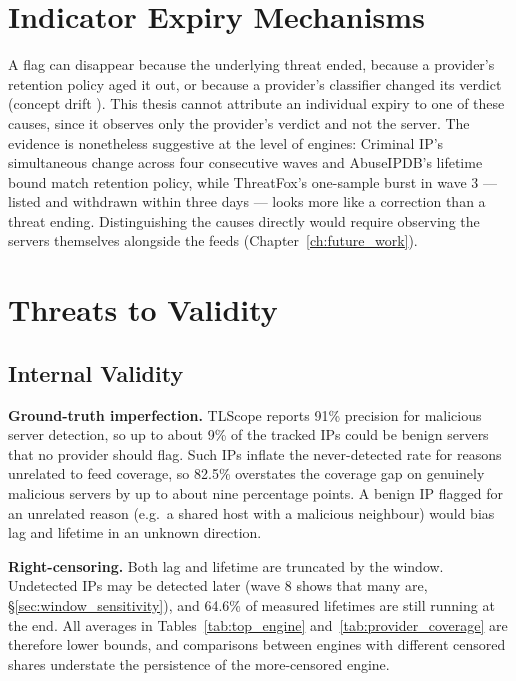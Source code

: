 \section{Indicator Expiry Mechanisms}
\label{sec:expiry}

A flag can disappear because the underlying threat ended, because a provider's retention policy
aged it out, or because a provider's classifier changed its verdict (concept drift
\cite{li2025conceptdrift}). This thesis cannot attribute an individual expiry to one of these causes,
since it observes only the provider's verdict and not the server. The evidence is nonetheless
suggestive at the level of engines: Criminal IP's simultaneous change across four consecutive waves
and AbuseIPDB's lifetime bound match retention policy, while ThreatFox's one-sample burst in wave 3
--- listed and withdrawn within three days --- looks more like a correction than a threat ending.
Distinguishing the causes directly would require observing the servers themselves alongside the
feeds (Chapter~\ref{ch:future_work}).

\section{Threats to Validity}
\label{sec:threats_to_validity}

\subsection{Internal Validity}

\textbf{Ground-truth imperfection.} TLScope reports 91\% precision for malicious server detection,
so up to about 9\% of the tracked IPs could be benign servers that no provider should flag. Such IPs
inflate the never-detected rate for reasons unrelated to feed coverage, so 82.5\% overstates the
coverage gap on genuinely malicious servers by up to about nine percentage points. A benign IP
flagged for an unrelated reason (e.g.\ a shared host with a malicious neighbour) would bias lag and
lifetime in an unknown direction.

\textbf{Right-censoring.} Both lag and lifetime are truncated by the window. Undetected IPs may be
detected later (wave 8 shows that many are, \S\ref{sec:window_sensitivity}), and 64.6\% of measured
lifetimes are still running at the end. All averages in Tables~\ref{tab:top_engine}
and~\ref{tab:provider_coverage} are therefore lower bounds, and comparisons between engines with
different censored shares understate the persistence of the more-censored engine.

